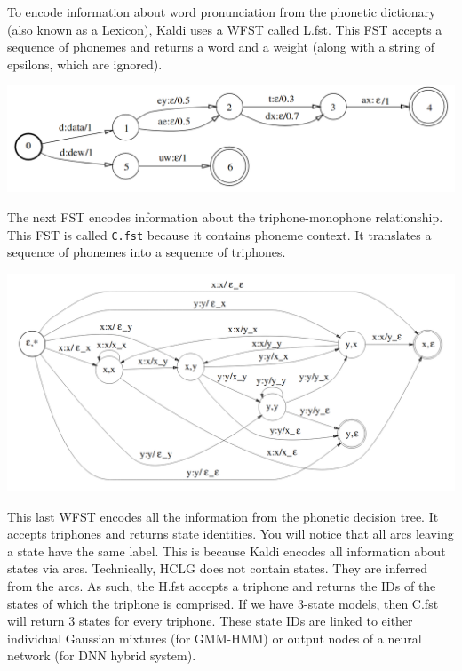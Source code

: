 \documentclass[10pt,a4paper]{article}
\begin{document}
To encode information about word pronunciation from the phonetic dictionary (also known as a Lexicon), Kaldi uses a WFST called L.fst. This FST accepts a sequence of phonemes and returns a word and a weight (along with a string of epsilons, which are ignored).

\begin{center}
  \includegraphics[width=.9\textwidth,keepaspectratio]{figs/mohri-L.png}
\end{center}

The next FST encodes information about the triphone-monophone relationship. This FST is called \texttt{C.fst} because it contains phoneme context. It translates a sequence of phonemes into a sequence of triphones.

\begin{center}
  \includegraphics[width=.9\textwidth,keepaspectratio]{figs/mohri-C.png}
\end{center}

This last WFST encodes all the information from the phonetic decision tree. It accepts triphones and returns state identities. You will notice that all arcs leaving a state have the same label. This is because Kaldi encodes all information about states via arcs. Technically, HCLG does not contain states. They are inferred from the arcs. As such, the H.fst accepts a triphone and returns the IDs of the states of which the triphone is comprised. If we have 3-state models, then C.fst will return 3 states for every triphone. These state IDs are linked to either individual Gaussian mixtures (for GMM-HMM) or output nodes of a neural network (for DNN hybrid system).
\end{document}
